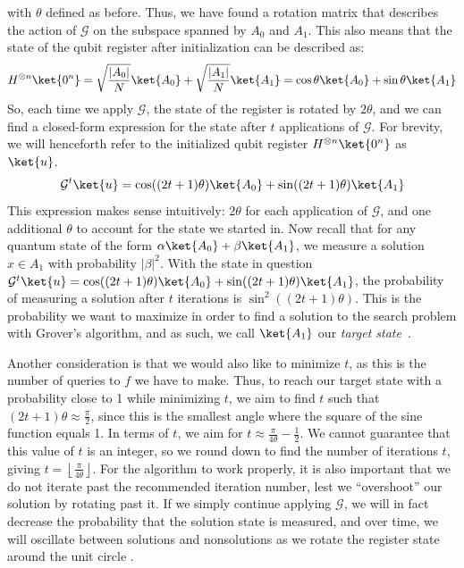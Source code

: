 with $\theta$ defined as before. Thus, we have found a rotation matrix that describes the action of $\mathcal{G}$ on the subspace spanned by $A_0$ and $A_1$. This also means that the state of the qubit register after initialization can be described as:
\[
H^{\otimes n} \ket{0^n} = \sqrt{\frac{|A_0|}{N}}\ket{A_0} + \sqrt{\frac{|A_1|}{N}}\ket{A_1} = \cos \theta \ket{A_0} + \sin \theta \ket{A_1}
\]
So, each time we apply $\mathcal{G}$, the state of the register is rotated by $2\theta$, and we can find a closed-form expression for the state after $t$ applications of $\mathcal{G}$. For brevity, we will henceforth refer to the initialized qubit register $H^{\otimes n} \ket{0^n}$ as $\ket{u}$.
\[
    \mathcal{G}^t \ket{u} = \cos ((2t+1)\theta) \ket{A_0} + \sin ((2t+1)\theta) \ket{A_1}
\]
This expression makes sense intuitively: $2\theta$ for each application of $\mathcal{G}$, and one additional $\theta$ to account for the state we started in. Now recall that for any quantum state of the 
form $\alpha\ket{A_0} + \beta \ket{A_1}$, we measure a solution $x \in A_1$ with probability $|\beta|^2$. With the state in question $\mathcal{G}^t \ket{u} = \cos ((2t+1)\theta) \ket{A_0} + \sin ((2t+1)\theta) \ket{A_1}$, the probability of measuring a solution after $t$ iterations is $\sin^2((2t+1)\theta)$. This is the probability we want to maximize in order to find a solution to the search problem with Grover's algorithm, and as such, we call $\ket{A_1}$ our \emph{target state}~\cite{Qiskit2023}. 

Another consideration is that we would also like to minimize $t$, as this is the number of queries to $f$ we have to make. Thus, to reach our target state with a probability close to 1 while minimizing $t$, we aim to find $t$ such that $(2t+1)\theta \approx \frac{\pi}{2}$, since this is the smallest angle where the square of the sine function equals 1. In terms of $t$, we aim for $t\approx\frac{\pi}{4\theta} - \frac{1}{2}$. We cannot guarantee that this value of $t$ is an integer, so we round down to find the number of iterations $t$, giving $t = \left \lfloor \frac{\pi}{4\theta} \right \rfloor$. For the algorithm to work properly, it is also important that we do not iterate past the recommended iteration number, lest we ``overshoot'' our solution by rotating past it. If we simply continue applying $\mathcal{G}$, we will in fact decrease the probability that the solution state is measured, and over time, we will oscillate between solutions and nonsolutions as we rotate the register state around the unit circle \cite{Qiskit2023}.

